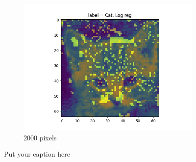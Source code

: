 \documentclass{article}
\begin{document}
\begin{figure}[H]
\begin{subfigure}{.33\textwidth}
  \includegraphics[width=1\linewidth]{2e/,2000, Log reg.png}  
  \caption{2000 pixels}
  \label{fig:sub-second}
\end{subfigure}
\caption{Put your caption here}
\label{feet select 2e}
\end{figure}
\end{document}
